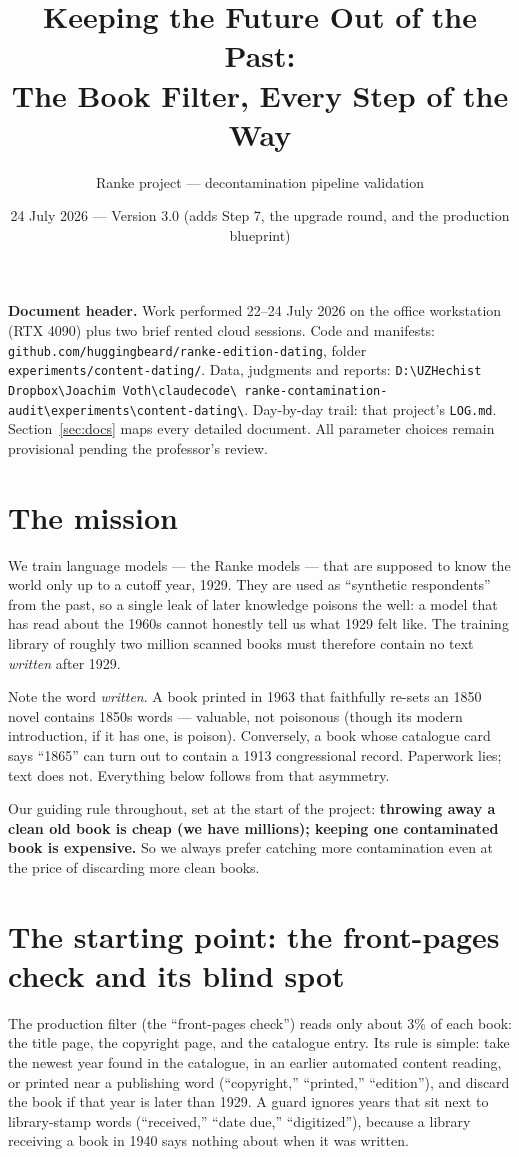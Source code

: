 \documentclass[11pt]{article}
\title{\Large\bfseries Keeping the Future Out of the Past:\\
The Book Filter, Every Step of the Way}
\author{Ranke project --- decontamination pipeline validation}
\date{24 July 2026 --- Version 3.0 (adds Step 7, the upgrade round, and the production blueprint)}
\begin{document}
\maketitle

\begin{small}
\noindent\textbf{Document header.} Work performed 22--24 July 2026 on the office workstation (RTX 4090) plus
two brief rented cloud sessions. Code and manifests: \texttt{github.com/huggingbeard/ranke-edition-dating},
folder \texttt{experiments/content-dating/}. Data, judgments and reports:
\texttt{D:\textbackslash UZHechist Dropbox\textbackslash Joachim Voth\textbackslash claudecode\textbackslash
ranke-contamination-audit\textbackslash experiments\textbackslash content-dating\textbackslash}.
Day-by-day trail: that project's \texttt{LOG.md}. Section~\ref{sec:docs} maps every detailed document.
All parameter choices remain provisional pending the professor's review.
\end{small}

\tableofcontents

\section{The mission}
We train language models --- the Ranke models --- that are supposed to know the world only up to a
cutoff year, 1929. They are used as ``synthetic respondents'' from the past, so a single leak of later
knowledge poisons the well: a model that has read about the 1960s cannot honestly tell us what 1929 felt
like. The training library of roughly two million scanned books must therefore contain no text
\emph{written} after 1929.

Note the word \emph{written}. A book printed in 1963 that faithfully re-sets an 1850 novel contains
1850s words --- valuable, not poisonous (though its modern introduction, if it has one, is poison).
Conversely, a book whose catalogue card says ``1865'' can turn out to contain a 1913 congressional
record. Paperwork lies; text does not. Everything below follows from that asymmetry.

Our guiding rule throughout, set at the start of the project: \textbf{throwing away a clean old book is
cheap (we have millions); keeping one contaminated book is expensive.} So we always prefer catching more
contamination even at the price of discarding more clean books.

\section{The starting point: the front-pages check and its blind spot}
The production filter (the ``front-pages check'') reads only about 3\% of each book: the title page,
the copyright page, and the catalogue entry. Its rule is simple: take the newest year found in the
catalogue, in an earlier automated content reading, or printed near a publishing word
(``copyright,'' ``printed,'' ``edition''), and discard the book if that year is later than 1929.
A guard ignores years that sit next to library-stamp words (``received,'' ``date due,'' ``digitized''),
because a library receiving a book in 1940 says nothing about when it was written.
\end{document}
